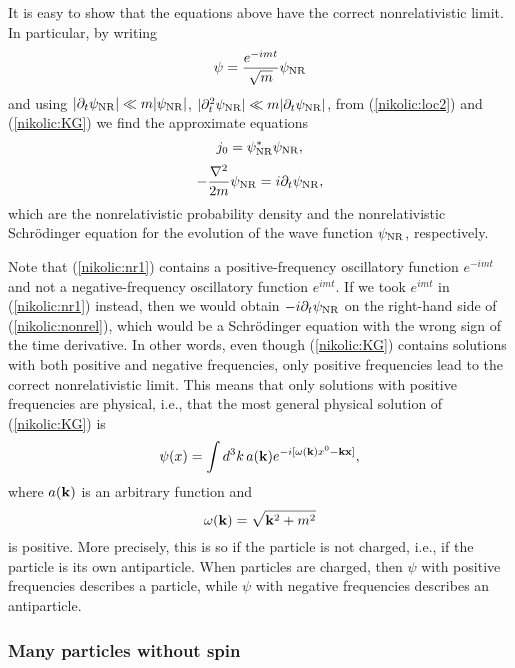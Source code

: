\documentclass[12pt,twoside]{report} %
\begin{document}
It is easy to show that the equations above have the correct
nonrelativistic limit. In particular, by writing
\begin{equation}\label{nikolic:nr1}
\psi=\frac{e^{-imt}}{\sqrt{m}}\psi_{\rm NR}
\end{equation}
and using $|\partial_t\psi_{\rm NR}|\ll m|\psi_{\rm NR}|$,
$|\partial^2_t\psi_{\rm NR}|\ll m|\partial_t\psi_{\rm NR}|$,
from (\ref{nikolic:loc2}) and (\ref{nikolic:KG}) we find the approximate
equations
\begin{equation}
j_0=\psi_{\rm NR}^*\psi_{\rm NR},
\end{equation}
\begin{equation}\label{nikolic:nonrel}
-\frac{\nabla^2}{2m}\psi_{\rm NR}=i\partial_t\psi_{\rm NR},
\end{equation}
which are the nonrelativistic 
probability density and the 
nonrelativistic Schr\"o\-din\-ger equation for the evolution of the wave function
$\psi_{\rm NR}$, respectively.

Note that (\ref{nikolic:nr1}) contains a positive-frequency oscillatory function
$e^{-imt}$ and not a negative-frequency oscillatory function  $e^{imt}$.
If we took $e^{imt}$ in (\ref{nikolic:nr1}) instead, then we would obtain $-i\partial_t\psi_{\rm NR}$
on the right-hand side of (\ref{nikolic:nonrel}), which would be a Schr\"odinger equation
with the wrong sign of the time derivative. In other words, even though 
(\ref{nikolic:KG}) contains solutions with both positive and negative frequencies,
only positive frequencies lead to the correct nonrelativistic limit. This means that
only solutions with positive frequencies are physical, i.e., that the most general
physical solution of (\ref{nikolic:KG}) is
\begin{equation}\label{nikolic:e3.9f}
\psi(x)=\int d^3k \,  a({\bf k})
e^{-i[\omega({\bf k})x^0-{\bf k}{\bf x}]} , 
\end{equation}
where $a({\bf k})$ is an arbitrary function and
\begin{equation}\label{nikolic:e3.9'f}
\omega({\bf k})=\sqrt{{\bf k}^2+m^2}
\end{equation} 
is positive. More precisely, this is so if the particle is not charged, i.e., if the particle is its own antiparticle. When particles are charged, then $\psi$ with positive frequencies
describes a particle, while $\psi$ with negative frequencies
describes an antiparticle.


\subsubsection{Many particles without spin}
\end{document}
